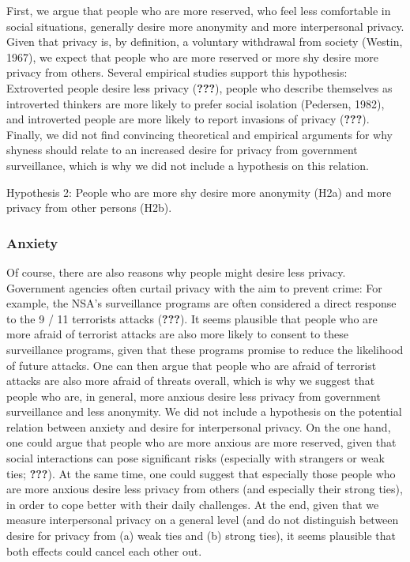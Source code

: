 \documentclass[man]{apa6}
\theoremstyle{definition}
\theoremstyle{definition}
\theoremstyle{definition}
\theoremstyle{remark}
\begin{document}
First, we argue that people who are more reserved, who feel less
comfortable in social situations, generally desire more anonymity and
more interpersonal privacy. Given that privacy is, by definition, a
voluntary withdrawal from society (Westin, 1967), we expect that people
who are more reserved or more shy desire more privacy from others.
Several empirical studies support this hypothesis: Extroverted people
desire less privacy ({\textbf{???}}), people who describe themselves as
introverted thinkers are more likely to prefer social isolation
(Pedersen, 1982), and introverted people are more likely to report
invasions of privacy ({\textbf{???}}). Finally, we did not find
convincing theoretical and empirical arguments for why shyness should
relate to an increased desire for privacy from government surveillance,
which is why we did not include a hypothesis on this relation.

Hypothesis 2: People who are more shy desire more anonymity (H2a) and
more privacy from other persons (H2b).

\hypertarget{anxiety}{%
\subsubsection{Anxiety}\label{anxiety}}

Of course, there are also reasons why people might desire less privacy.
Government agencies often curtail privacy with the aim to prevent crime:
For example, the NSA's surveillance programs are often considered a
direct response to the 9 / 11 terrorists attacks ({\textbf{???}}). It
seems plausible that people who are more afraid of terrorist attacks are
also more likely to consent to these surveillance programs, given that
these programs promise to reduce the likelihood of future attacks. One
can then argue that people who are afraid of terrorist attacks are also
more afraid of threats overall, which is why we suggest that people who
are, in general, more anxious desire less privacy from government
surveillance and less anonymity. We did not include a hypothesis on the
potential relation between anxiety and desire for interpersonal privacy.
On the one hand, one could argue that people who are more anxious are
more reserved, given that social interactions can pose significant risks
(especially with strangers or weak ties; {\textbf{???}}). At the same
time, one could suggest that especially those people who are more
anxious desire less privacy from others (and especially their strong
ties), in order to cope better with their daily challenges. At the end,
given that we measure interpersonal privacy on a general level (and do
not distinguish between desire for privacy from (a) weak ties and (b)
strong ties), it seems plausible that both effects could cancel each
other out.
\end{document}
